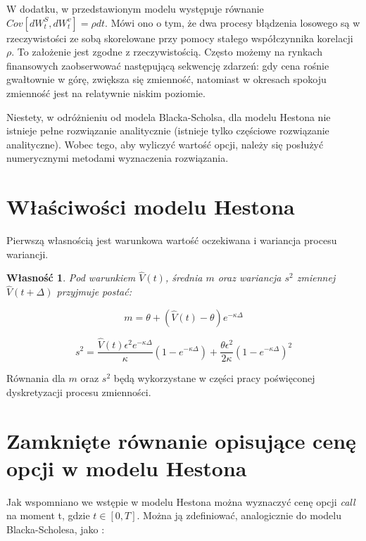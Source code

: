 \documentclass{pracamgr}
\newtheorem{prop}{Własność}
\begin{document}
W dodatku, w przedstawionym modelu występuje równanie $Cov[dW^S_t, dW^v_t] = \rho dt $. Mówi ono o tym, że 
dwa procesy błądzenia losowego są w rzeczywistości ze sobą skorelowane przy pomocy stałego współczynnika 
korelacji $\rho$.
To założenie jest zgodne z rzeczywistością. Często możemy na rynkach finansowych zaobserwować następującą sekwencję zdarzeń: gdy cena rośnie gwałtownie w górę, zwiększa się zmienność, 
natomiast w okresach spokoju zmienność jest na relatywnie niskim poziomie.

Niestety, w odróżnieniu od modela Blacka-Scholsa, dla modelu Hestona nie istnieje pełne rozwiązanie analitycznie (istnieje tylko częściowe rozwiązanie analityczne). Wobec tego, aby 
wyliczyć wartość opcji, należy się posłużyć numerycznymi metodami wyznaczenia rozwiązania.

\section{Właściwości modelu Hestona} %
\label{sec:wlasciwosci_modelu_hestona}
Pierwszą własnością jest warunkowa wartość oczekiwana i wariancja procesu wariancji. 
\begin{prop}
Pod warunkiem $\hat{V}(t)$, średnia $m$ oraz wariancja $s^2$ zmiennej $\hat{V}(t + \Delta)$ przyjmuje postać:

\begin{equation}
  \label{eq:m}
  m= \theta + (\hat{V}(t) - \theta) e^{-\kappa \Delta}
\end{equation}

\begin{equation}
  \label{eq:s2}
  s^2 = \frac{\hat{V}(t)\epsilon^2 e^{-\kappa \Delta}}{\kappa} (1 - e^{-\kappa \Delta}) + \frac{\theta \epsilon^2}{2 \kappa}(1 - e^{-\kappa \Delta})^2
\end{equation}
\end{prop}

Równania dla $m$ oraz $s^2$ będą wykorzystane w części pracy poświęconej dyskretyzacji procesu zmienności.

\section{Zamknięte równanie opisujące cenę opcji w modelu Hestona}

Jak wspomniano we wstępie w modelu Hestona można wyznaczyć cenę opcji \textit{call} na moment t, gdzie $t \in [0, T]$. Można ją zdefiniować, analogicznie do modelu Blacka-Scholesa, jako \cite{Heston}:
\end{document}
